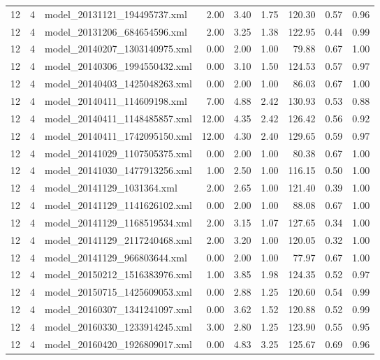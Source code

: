 \begin{table}[ht]
\begin{tabular}{rrlrrrrrr}
   12 &   4 & model\_20131121\_194495737.xml & 2.00 & 3.40 & 1.75 & 120.30 & 0.57 & 0.96 \\ 
   12 &   4 & model\_20131206\_684654596.xml & 2.00 & 3.25 & 1.38 & 122.95 & 0.44 & 0.99 \\ 
   12 &   4 & model\_20140207\_1303140975.xml & 0.00 & 2.00 & 1.00 & 79.88 & 0.67 & 1.00 \\ 
   12 &   4 & model\_20140306\_1994550432.xml & 0.00 & 3.10 & 1.50 & 124.53 & 0.57 & 0.97 \\ 
   12 &   4 & model\_20140403\_1425048263.xml & 0.00 & 2.00 & 1.00 & 86.03 & 0.67 & 1.00 \\ 
   12 &   4 & model\_20140411\_114609198.xml & 7.00 & 4.88 & 2.42 & 130.93 & 0.53 & 0.88 \\ 
   12 &   4 & model\_20140411\_1148485857.xml & 12.00 & 4.35 & 2.42 & 126.42 & 0.56 & 0.92 \\ 
   12 &   4 & model\_20140411\_1742095150.xml & 12.00 & 4.30 & 2.40 & 129.65 & 0.59 & 0.97 \\ 
   12 &   4 & model\_20141029\_1107505375.xml & 0.00 & 2.00 & 1.00 & 80.38 & 0.67 & 1.00 \\ 
   12 &   4 & model\_20141030\_1477913256.xml & 1.00 & 2.50 & 1.00 & 116.15 & 0.50 & 1.00 \\ 
   12 &   4 & model\_20141129\_1031364.xml & 2.00 & 2.65 & 1.00 & 121.40 & 0.39 & 1.00 \\ 
   12 &   4 & model\_20141129\_1141626102.xml & 0.00 & 2.00 & 1.00 & 88.08 & 0.67 & 1.00 \\ 
   12 &   4 & model\_20141129\_1168519534.xml & 2.00 & 3.15 & 1.07 & 127.65 & 0.34 & 1.00 \\ 
   12 &   4 & model\_20141129\_2117240468.xml & 2.00 & 3.20 & 1.00 & 120.05 & 0.32 & 1.00 \\ 
   12 &   4 & model\_20141129\_966803644.xml & 0.00 & 2.00 & 1.00 & 77.97 & 0.67 & 1.00 \\ 
   12 &   4 & model\_20150212\_1516383976.xml & 1.00 & 3.85 & 1.98 & 124.35 & 0.52 & 0.97 \\ 
   12 &   4 & model\_20150715\_1425609053.xml & 0.00 & 2.88 & 1.25 & 120.60 & 0.54 & 0.99 \\ 
   12 &   4 & model\_20160307\_1341241097.xml & 0.00 & 3.62 & 1.52 & 120.88 & 0.52 & 0.99 \\ 
   12 &   4 & model\_20160330\_1233914245.xml & 3.00 & 2.80 & 1.25 & 123.90 & 0.55 & 0.95 \\ 
   12 &   4 & model\_20160420\_1926809017.xml & 0.00 & 4.83 & 3.25 & 125.67 & 0.69 & 0.96 \\ 

\end{tabular}
\end{table}
